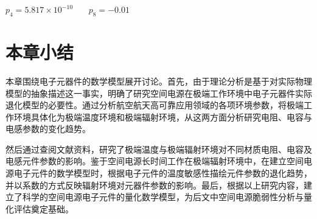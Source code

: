 \qquad \qquad $p_4= 5.817\times 10^{-10}$     \qquad \qquad ~~~$ p_8=-0.01$
\iffalse
\begin{table}[htbp]
  \centering
\begin{tabular}{p{5cm}p{5cm}}

  $p_1=-1.569\times 10^{-16}$     & $p_5= 1.780\times 10^{-7} $\\

  $p_2= 1.085\times 10^{-13}$     & $p_6=-1.461\times 10^{-5}$ \\

  $p_3=-2.215\times 10^{-11}$     & $p_7= 0.487\times 10^{-4}$ \\

 $p_4= 5.817\times 10^{-10}$      & $ p_8=-0.01$ \\

\end{tabular}
\end{table}
\fi
\section{本章小结}
\label{sec:chap2:sum}
本章围绕电子元器件的数学模型展开讨论。首先，由于理论分析是基于对实际物理模型的抽象描述这一事实，明确了研究空间电源在极端工作环境中电子元器件实际退化模型的必要性。通过分析航空航天高可靠应用领域的各项环境参数，将极端工作环境具体化为极端温度环境和极端辐射环境，从这两方面分析研究电阻、电容与电感参数的变化趋势。

然后通过查阅文献资料，研究了极端温度与极端辐射环境对不同材质电阻、电容及电感元件参数的影响。鉴于空间电源长时间工作在极端辐射环境中，在建立空间电源电子元件的数学模型时，根据电子元件的温度敏感性描绘元件参数的退化趋势，并以系数的方式反映辐射环境对元器件参数的影响。最后，根据以上研究内容，建立了科学的空间电源电子元件的量化数学模型，为后文中空间电源脆弱性分析与量化评估奠定基础。


